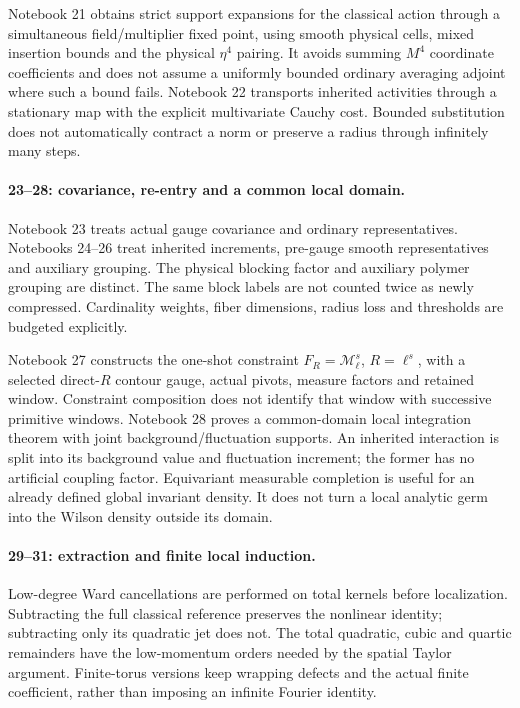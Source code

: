 Notebook 21 obtains strict support expansions
for the classical action through a simultaneous
field/multiplier fixed point, using smooth
physical cells, mixed insertion bounds and
the physical \(\eta^4\) pairing. It avoids
summing \(M^4\) coordinate coefficients and
does not assume a uniformly bounded ordinary
averaging adjoint where such a bound fails.
Notebook 22 transports inherited activities
through a stationary map with the explicit
multivariate Cauchy cost. Bounded substitution
does not automatically contract a norm or
preserve a radius through infinitely many steps.

\paragraph{23--28: covariance, re-entry and a common local domain.}
Notebook 23 treats actual gauge covariance
and ordinary representatives. Notebooks
24--26 treat inherited increments, pre-gauge
smooth representatives and auxiliary grouping.
The physical blocking factor and auxiliary
polymer grouping are distinct. The same
block labels are not counted twice as newly
compressed. Cardinality weights, fiber
dimensions, radius loss and thresholds
are budgeted explicitly.

Notebook 27 constructs the one-shot constraint
\(F_R=\mathcal M_\ell^s\), \(R=\ell^s\),
with a selected direct-\(R\) contour gauge,
actual pivots, measure factors and retained
window. Constraint composition does not
identify that window with successive
primitive windows. Notebook 28 proves a
common-domain local integration theorem
with joint background/fluctuation supports.
An inherited interaction is split into its
background value and fluctuation increment;
the former has no artificial coupling factor.
Equivariant measurable completion is useful
for an already defined global invariant
density. It does not turn a local analytic
germ into the Wilson density outside its domain.

\paragraph{29--31: extraction and finite local induction.}
Low-degree Ward cancellations are performed
on total kernels before localization.
Subtracting the full classical reference
preserves the nonlinear identity; subtracting
only its quadratic jet does not.
The total quadratic, cubic and quartic
remainders have the low-momentum orders
needed by the spatial Taylor argument.
Finite-torus versions keep wrapping defects
and the actual finite coefficient, rather
than imposing an infinite Fourier identity.

